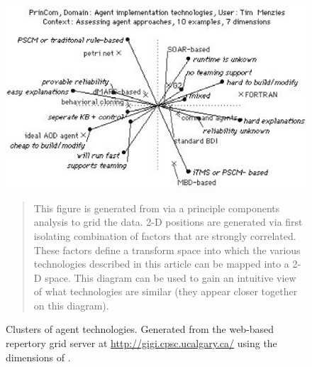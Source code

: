 \begin{figure}[!t]
\begin{center}
 \includegraphics[width=5in]{star.eps}

{\em \begin{quote} {\sffamily This figure is generated from \protect{}
via a principle components analysis to grid the data. 2-D positions are
generated via first isolating combination of factors that are strongly
correlated. These factors define a transform space into which the various
technologies described in this article can be mapped into a 2-D space. This
diagram can be used to gain an intuitive view of what technologies are similar
(they appear closer together on this diagram).
 }\end{quote}}
  \end{center}
  \caption{Clusters of
agent technologies. Generated from the web-based repertory grid
server at \protect\url{http://gigi.cpsc.ucalgary.ca/} using the
dimensions of .}\label{fig:cluster}
\end{figure}

